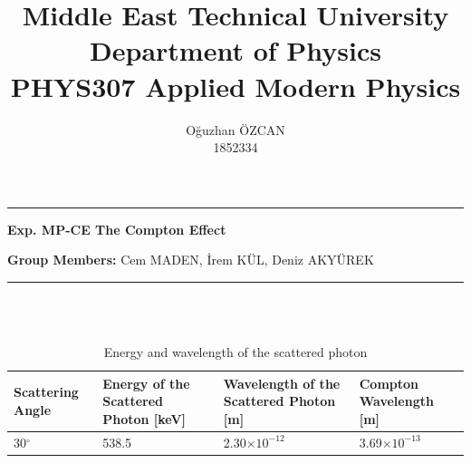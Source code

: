 \documentclass[a4paper,12pt]{article}
\title{Middle East Technical University\\Department of Physics\\\textbf{PHYS307 Applied Modern Physics}}
\author{Oğuzhan ÖZCAN\\1852334}
\date{}
\providecommand{\groupmember}[1]{\textbf{Group Members:} }
\providecommand{\expname}[1]{\textbf{Exp. MP-CE The Compton Effect} }
\begin{document}
\maketitle

\thispagestyle{fancy}

\noindent\rule{18.4cm}{0.8pt}
\begin{center}
	\expname{arg1}{}
\end{center}
\groupmember{arg1}{Cem MADEN, İrem KÜL, Deniz AKYÜREK}\\

\noindent\rule{18.4cm}{0.8pt}\\\\
\begin{table}[h!]
\begin{center}
	\begin{tabular}{|p{3cm}|p{3cm}|p{3cm}|p{3cm}|}
	\hline Scattering Angle & Energy of the Scattered Photon [keV] & Wavelength of the Scattered Photon [m] & Compton Wavelength [m] \\ 
	\hline 30$^{\circ}$ & 538.5 & 2.30$\times10^{-12}$ & 3.69$\times10^{-13}$ \\ 
	\hline 
\end{tabular}
\caption{Energy and wavelength of the scattered photon} 
\end{center}
\end{table}
\end{document}
